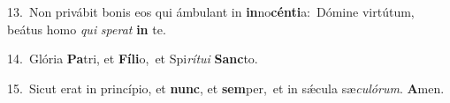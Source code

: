 {\numbfont\textcolor{\numbcolor}{13.}}~Non privábit bonis eos qui ámbulant in \textbf{in}\-no\-\textbf{cén}\-\textbf{ti}a:~\star Dómine virtútum, beátus homo \textit{qui} \textit{spe}\-\textit{rat} \textbf{in} te.\par
{\numbfont\textcolor{\numbcolor}{14.}}~Glória \textbf{Pa}\-tri, et \textbf{Fí}\-\textbf{li}o,~\star et Spi\-\textit{rí}\-\textit{tu}\textit{i} \textbf{Sanc}\-to.\par
{\numbfont\textcolor{\numbcolor}{15.}}~Sicut erat in princípio, et \textbf{nunc}\-, et \textbf{sem}\-per,~\star et in sǽcula sæ\-\textit{cu}\-\textit{ló}\textit{rum}. \textbf{A}\-men.\par
